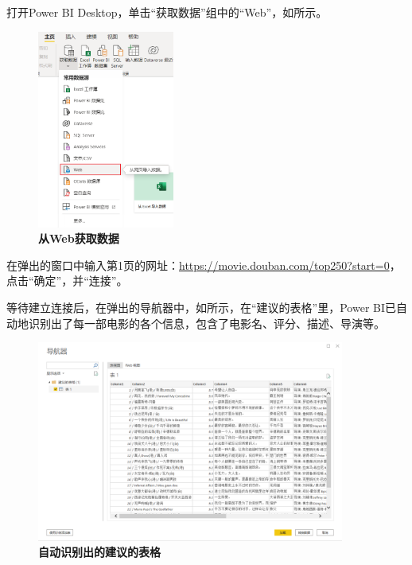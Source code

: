 打开Power BI Desktop，单击``获取数据''组中的``Web''，如所示。

\begin{figure}[htbp]
    \centering
    \includegraphics[width=0.4\textwidth]{figure/PowerBI/douban_import_from_web.png}
    \caption{\textbf{从Web获取数据}}
    \label{fig:douban_import_from_web}
\end{figure}

在弹出的窗口中输入第1页的网址：\url{https://movie.douban.com/top250?start=0}，点击``确定''，并``连接''。

等待建立连接后，在弹出的导航器中，如所示，在``建议的表格''里，Power BI已自动地识别出了每一部电影的各个信息，包含了电影名、评分、描述、导演等。

\begin{figure}[htbp]
    \centering
    \includegraphics[width=0.9\textwidth]{figure/PowerBI/douban_advice_table.png}
    \caption{\textbf{自动识别出的建议的表格}}
    \label{fig:douban_advice_table}
\end{figure}

